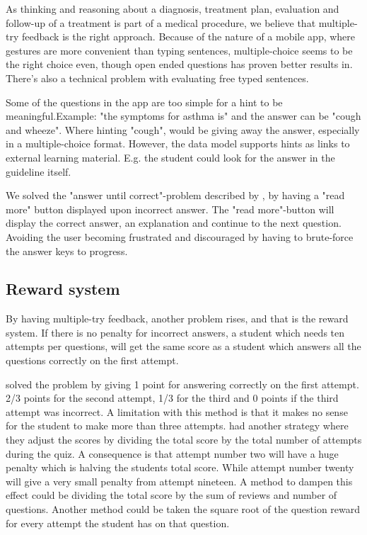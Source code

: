 As thinking and reasoning about a diagnosis, treatment plan, evaluation and follow-up of a treatment is part of a medical procedure, we believe that multiple-try feedback is the right approach. Because of the nature of a mobile app, where gestures are more convenient than typing sentences, multiple-choice seems to be the right choice even, though open ended questions has proven better results in. There's also a technical problem with evaluating free typed sentences.

Some of the questions in the app are too simple for a hint to be meaningful.Example: "the symptoms for asthma is" and the answer can be "cough and wheeze". Where hinting "cough", would be giving away the answer, especially in a multiple-choice format. However, the data model supports hints as links to external learning material. E.g. the student could look for the answer in the guideline itself.

We solved the "answer until correct"-problem described by \textcite{Morrison1995}, by having a "read more" button displayed upon incorrect answer. The "read more"-button will display the correct answer, an explanation and continue to the next question. Avoiding the user becoming frustrated and discouraged by having to brute-force the answer keys to progress.




\subsection{Reward system}
By having multiple-try feedback, another problem rises, and that is the reward system. If there is no penalty for incorrect answers, a student which needs ten attempts per questions, will get the same score as a student which answers all the questions correctly on the first attempt.

\textcite{Attali2015} solved the problem by giving 1 point for answering correctly on the first attempt. 2/3 points for the second attempt, 1/3 for the third and 0 points if the third attempt was incorrect. A limitation with this method is that it makes no sense for the student to make more than three attempts. \textcite{Morrison1995} had another strategy where they adjust the scores by dividing the total score by the total number of attempts during the quiz. A consequence is that attempt number two will have a huge penalty which is halving the students total score. While attempt number twenty will give a very small penalty from attempt nineteen. A method to dampen this effect could be dividing the total score by the sum of reviews and number of questions. Another method could be taken the square root of the question reward for every attempt the student has on that question.

